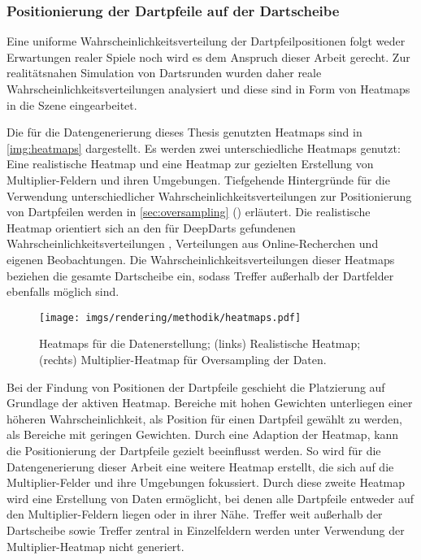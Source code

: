 \subsubsection{Positionierung der Dartpfeile auf der Dartscheibe}
\label{sec:dartpfeil_positionierung}

Eine uniforme Wahrscheinlichkeitsverteilung der Dartpfeilpositionen folgt weder Erwartungen realer Spiele noch wird es dem Anspruch dieser Arbeit gerecht. Zur realitätsnahen Simulation von Dartsrunden wurden daher reale Wahrscheinlichkeitsverteilungen analysiert und diese sind in Form von Heatmaps in die Szene eingearbeitet.

Die für die Datengenerierung dieses Thesis genutzten Heatmaps sind in \autoref{img:heatmaps} dargestellt. Es werden zwei unterschiedliche Heatmaps genutzt: Eine realistische Heatmap und eine Heatmap zur gezielten Erstellung von Multiplier-Feldern und ihren Umgebungen. Tiefgehende Hintergründe für die Verwendung unterschiedlicher Wahrscheinlichkeitsverteilungen zur Positionierung von Dartpfeilen werden in \autoref{sec:oversampling} () erläutert. Die realistische Heatmap orientiert sich an den für DeepDarts gefundenen Wahrscheinlichkeitsverteilungen \cite{deepdarts}, Verteilungen aus Online-Recherchen \cite{heatmap} und eigenen Beobachtungen. Die Wahrscheinlichkeitsverteilungen dieser Heatmaps beziehen die gesamte Dartscheibe ein, sodass Treffer außerhalb der Dartfelder ebenfalls möglich sind.

\begin{figure}
    \centering
    \texttt{[image: imgs/rendering/methodik/heatmaps.pdf]}
    \caption{Heatmaps für die Datenerstellung; (links) Realistische Heatmap; (rechts) Multiplier-Heatmap für Oversampling der Daten.}
    \label{img:heatmaps}
\end{figure}

Bei der Findung von Positionen der Dartpfeile geschieht die Platzierung auf Grundlage der aktiven Heatmap. Bereiche mit hohen Gewichten unterliegen einer höheren Wahrscheinlichkeit, als Position für einen Dartpfeil gewählt zu werden, als Bereiche mit geringen Gewichten. Durch eine Adaption der Heatmap, kann die Positionierung der Dartpfeile gezielt beeinflusst werden. So wird für die Datengenerierung dieser Arbeit eine weitere Heatmap erstellt, die sich auf die Multiplier-Felder und ihre Umgebungen fokussiert. Durch diese zweite Heatmap wird eine Erstellung von Daten ermöglicht, bei denen alle Dartpfeile entweder auf den Multiplier-Feldern liegen oder in ihrer Nähe. Treffer weit außerhalb der Dartscheibe sowie Treffer zentral in Einzelfeldern werden unter Verwendung der Multiplier-Heatmap nicht generiert.


